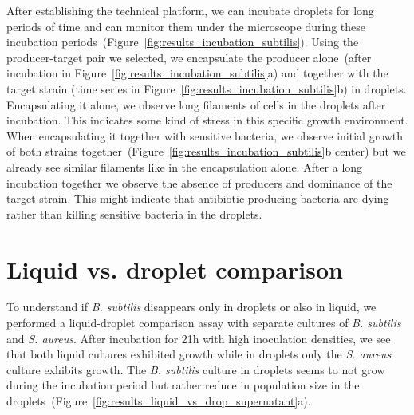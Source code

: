 After establishing the technical platform, we can incubate droplets for long periods of time and can monitor them under the microscope during these incubation periods~(Figure~\ref{fig:results_incubation_subtilis}). Using the producer-target pair we selected, we encapsulate the producer alone~(after incubation in Figure~\ref{fig:results_incubation_subtilis}a) and together with the target strain (time series in Figure~\ref{fig:results_incubation_subtilis}b) in droplets. Encapsulating it alone, we observe long filaments of cells in the droplets after incubation. This indicates some kind of stress in this specific growth environment. When encapsulating it together with sensitive bacteria, we observe initial growth of both strains together~(Figure~\ref{fig:results_incubation_subtilis}b center) but we already see similar filaments like in the encapsulation alone. After a long incubation together we observe the absence of producers and dominance of the target strain. This might indicate that antibiotic producing bacteria are dying rather than killing sensitive bacteria in the droplets.

\section{Liquid vs. droplet comparison}
To understand if \textit{B. subtilis} disappears only in droplets or also in liquid, we performed a liquid-droplet comparison assay with separate cultures of \textit{B. subtilis} and \textit{S. aureus}. After incubation for 21h with high inoculation densities, we see that both liquid cultures exhibited growth while in droplets only the \textit{S. aureus} culture exhibits growth. The \textit{B. subtilis} culture in droplets seems to not grow during the incubation period but rather reduce in population size in the droplets~(Figure~\ref{fig:results_liquid_vs_drop_supernatant}a).

